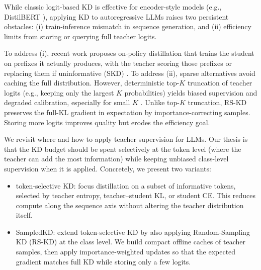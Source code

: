 \documentclass[11pt]{article}
\begin{document}
While classic logit-based KD is effective for encoder-style models (e.g., DistilBERT \citep{sanh2019distilbert}), applying KD to autoregressive LLMs raises two persistent obstacles: (i) train-inference mismatch in sequence generation, and (ii) efficiency limits from storing or querying full teacher logits.

To address (i), recent work proposes on-policy distillation that trains the student on prefixes it actually produces, with the teacher scoring those prefixes \citep{agarwal2024gkd} or replacing them if uninformative (SKD) \citep{xu2024speculative}.
To address (ii), sparse alternatives avoid caching the full distribution.
However, deterministic top-$K$ truncation of teacher logits (e.g., keeping only the largest $K$ probabilities) yields biased supervision and degraded calibration, especially for small $K$ \citep{anshumann2025sparse,shum2024first}.
Unlike top-$K$ truncation, RS-KD \citep{anshumann2025sparse} preserves the full-KL gradient in expectation by importance-correcting samples.
Storing more logits improves quality but erodes the efficiency goal.

We revisit where and how to apply teacher supervision for LLMs.
Our thesis is that the KD budget should be spent selectively at the token level (where the teacher can add the most information) while keeping unbiased class-level supervision when it is applied.
Concretely, we present two variants:
\begin{itemize}
	\item token-selective KD: focus distillation on a subset of informative tokens, selected by teacher entropy, teacher--student KL, or student CE. This reduces compute along the sequence axis without altering the teacher distribution itself.
	\item SampledKD: extend token-selective KD by also applying Random-Sampling KD (RS-KD) at the class level. We build compact offline caches of teacher samples, then apply importance-weighted updates so that the expected gradient matches full KD while storing only a few logits.
\end{itemize}
\end{document}
